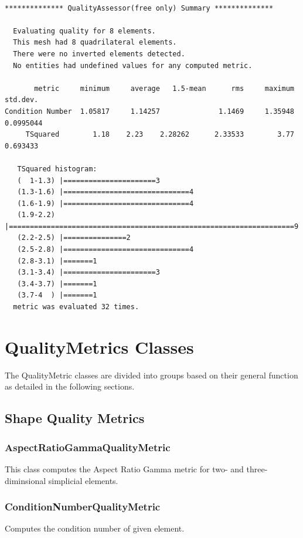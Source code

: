 \begin{verbatim}

************** QualityAssessor(free only) Summary **************

  Evaluating quality for 8 elements.
  This mesh had 8 quadrilateral elements.
  There were no inverted elements detected.
  No entities had undefined values for any computed metric.

       metric	  minimum     average	1.5-mean	  rms	  maximum    std.dev.
Condition Number  1.05817     1.14257		       1.1469	  1.35948   0.0995044
     TSquared	     1.18	 2.23	 2.28262      2.33533	     3.77    0.693433

   TSquared histogram:
   (  1-1.3) |======================3
   (1.3-1.6) |==============================4
   (1.6-1.9) |==============================4
   (1.9-2.2) |====================================================================9
   (2.2-2.5) |===============2
   (2.5-2.8) |==============================4
   (2.8-3.1) |=======1
   (3.1-3.4) |======================3
   (3.4-3.7) |=======1
   (3.7-4  ) |=======1
  metric was evaluated 32 times.

\end{verbatim}

\section{QualityMetrics Classes}

The QualityMetric classes are divided into groups based on their general function as detailed in the following sections.

\subsection{Shape Quality Metrics}

\subsubsection{AspectRatioGammaQualityMetric}

This class computes the Aspect Ratio Gamma metric for two- and three-diminsional simplicial elements.

\subsubsection{ConditionNumberQualityMetric}

  Computes the condition number of given element. 

